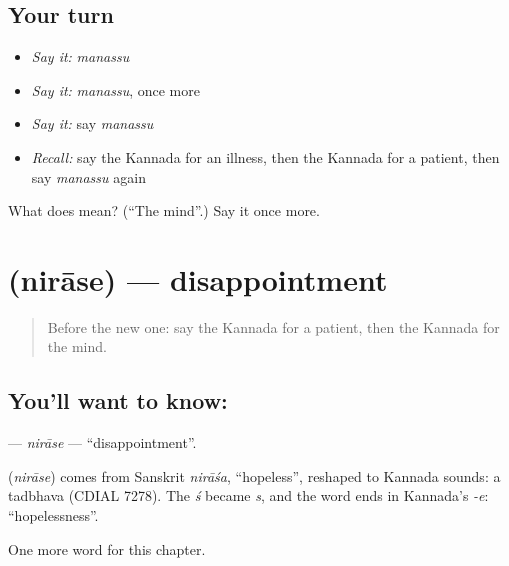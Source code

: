 \subsection*{Your turn}
\begin{itemize}
\raggedright
  \item \emph{Say it:} \emph{manassu}
  \item \emph{Say it:} \emph{manassu}, once more
  \item \emph{Say it:} say \emph{manassu}
  \item \emph{Recall:} say the Kannada for an illness, then the Kannada for a patient, then say \emph{manassu} again
\end{itemize}

\begin{tcolorbox}[breakable,colback=teal!4,colframe=teal!35!black,title={Before you move on}]
What does  mean? (\textquotedblleft{}The mind\textquotedblright{}.) Say it once more.
\end{tcolorbox}
\section[\texorpdfstring{\kn{ನಿರಾಸೆ} (nirāse)}{ನಿರಾಸೆ (nirāse)}]{ (nirāse) — disappointment}

\label{lesson:KA-C209-nirase}



\begin{quote}
Before the new one: say the Kannada for a patient, then the Kannada for the mind.
\end{quote}

\subsection*{You'll want to know: }
\textbf{} — \emph{nirāse} — \textquotedblleft{}disappointment\textquotedblright{}.

\begin{cousinweb}
\textbf{} (\emph{nirāse}) comes from Sanskrit \emph{nirāśa}, \textquotedblleft{}hopeless\textquotedblright{}, reshaped to Kannada sounds: a tadbhava (CDIAL 7278). The \emph{ś} became \emph{s}, and the word ends in Kannada's \emph{-e}: \textquotedblleft{}hopelessness\textquotedblright{}.
\end{cousinweb}

\begin{grammarlens}[title={What you've built}]
One more word for this chapter.
\end{grammarlens}

